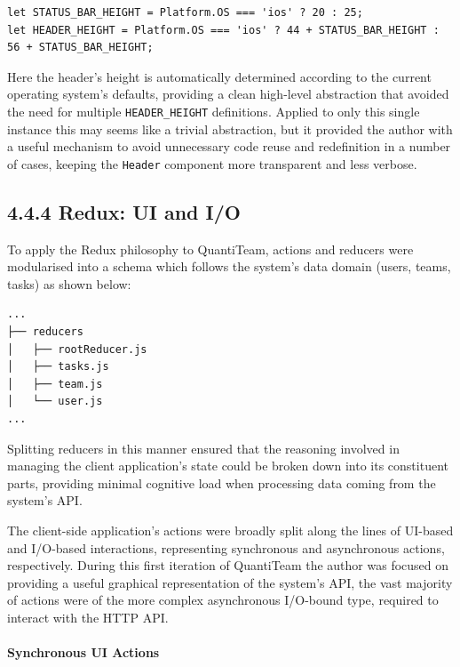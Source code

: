 \documentclass[12pt]{report}
\let\oldparagraph\paragraph
\renewcommand{\paragraph}[1]{\oldparagraph{#1}\mbox{}}
\begin{document}
\begin{verbatim}
let STATUS_BAR_HEIGHT = Platform.OS === 'ios' ? 20 : 25;
let HEADER_HEIGHT = Platform.OS === 'ios' ? 44 + STATUS_BAR_HEIGHT : 56 + STATUS_BAR_HEIGHT;
\end{verbatim}

Here the header's height is automatically determined according to the
current operating system's defaults, providing a clean high-level
abstraction that avoided the need for multiple \texttt{HEADER\_HEIGHT}
definitions. Applied to only this single instance this may seems like a
trivial abstraction, but it provided the author with a useful mechanism
to avoid unnecessary code reuse and redefinition in a number of cases,
keeping the \texttt{Header} component more transparent and less verbose.

\subsection{4.4.4 Redux: UI and I/O}\label{redux-ui-and-io}

To apply the Redux philosophy to QuantiTeam, actions and reducers were
modularised into a schema which follows the system's data domain (users,
teams, tasks) as shown below:

\begin{verbatim}
...
├── reducers
│   ├── rootReducer.js
│   ├── tasks.js
│   ├── team.js
│   └── user.js
...
\end{verbatim}

Splitting reducers in this manner ensured that the reasoning involved in
managing the client application's state could be broken down into its
constituent parts, providing minimal cognitive load when processing data
coming from the system's API.

The client-side application's actions were broadly split along the lines
of UI-based and I/O-based interactions, representing synchronous and
asynchronous actions, respectively. During this first iteration of
QuantiTeam the author was focused on providing a useful graphical
representation of the system's API, the vast majority of actions were of
the more complex asynchronous I/O-bound type, required to interact with
the HTTP API.

\paragraph{Synchronous UI Actions}\label{synchronous-ui-actions}
\end{document}
